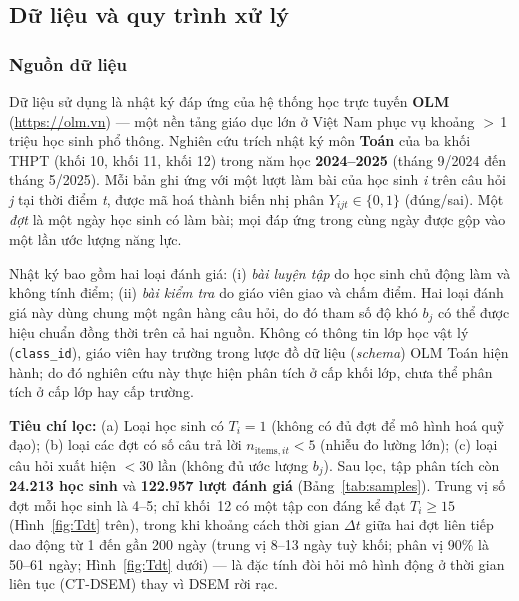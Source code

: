 
\subsection{Dữ liệu và quy trình xử lý}
\label{sec:data}

\subsubsection{Nguồn dữ liệu}

Dữ liệu sử dụng là nhật ký đáp ứng của hệ thống học trực tuyến \textbf{OLM} (\url{https://olm.vn}) --- một nền tảng giáo dục lớn ở Việt Nam phục vụ khoảng \(>\)\,1 triệu học sinh phổ thông. Nghiên cứu trích nhật ký môn \textbf{Toán} của ba khối THPT (khối 10, khối 11, khối 12) trong năm học \textbf{2024--2025} (tháng 9/2024 đến tháng 5/2025). Mỗi bản ghi ứng với một lượt làm bài của học sinh \emph{i} trên câu hỏi \emph{j} tại thời điểm \emph{t}, được mã hoá thành biến nhị phân \(Y_{ijt} \in \{0,1\}\) (đúng/sai). Một \emph{đợt} là một ngày học sinh có làm bài; mọi đáp ứng trong cùng ngày được gộp vào một lần ước lượng năng lực.

Nhật ký bao gồm hai loại đánh giá: (i) \emph{bài luyện tập} do học sinh chủ động làm và không tính điểm; (ii) \emph{bài kiểm tra} do giáo viên giao và chấm điểm. Hai loại đánh giá này dùng chung một ngân hàng câu hỏi, do đó tham số độ khó \(b_j\) có thể được hiệu chuẩn đồng thời trên cả hai nguồn. Không có thông tin lớp học vật lý (\texttt{class\_id}), giáo viên hay trường trong lược đồ dữ liệu (\emph{schema}) OLM Toán hiện hành; do đó nghiên cứu này thực hiện phân tích ở cấp khối lớp, chưa thể phân tích ở cấp lớp hay cấp trường.

\textbf{Tiêu chí lọc:} (a) Loại học sinh có \(T_i = 1\) (không có đủ đợt để mô hình hoá quỹ đạo); (b) loại các đợt có số câu trả lời \(n_{\mathrm{items},it} < 5\) (nhiễu đo lường lớn); (c) loại câu hỏi xuất hiện \(< 30\) lần (không đủ ước lượng \(b_j\)). Sau lọc, tập phân tích còn \textbf{24{.}213 học sinh} và \textbf{122{.}957 lượt đánh giá} (Bảng~\ref{tab:samples}). Trung vị số đợt mỗi học sinh là 4--5; chỉ khối~12 có một tập con đáng kể đạt \(T_i \ge 15\) (Hình~\ref{fig:Tdt} trên), trong khi khoảng cách thời gian \(\Delta t\) giữa hai đợt liên tiếp dao động từ 1 đến gần 200 ngày (trung vị 8--13 ngày tuỳ khối; phân vị 90\% là 50--61 ngày; Hình~\ref{fig:Tdt} dưới) --- là đặc tính đòi hỏi mô hình động ở thời gian liên tục (CT-DSEM) thay vì DSEM rời rạc.

